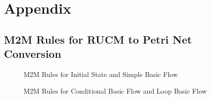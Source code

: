 \chapter{Appendix}
\section{M2M Rules for RUCM to Petri Net Conversion}\label{m2mrulesmain}


%    
%   

\begin{figure}[H]
\centering
{}
\caption{M2M Rules for Initial State and Simple Basic Flow}
\label{fig:m2mrulesdiagram1}
\end{figure}


\begin{figure}[H]
\centering
{}
\caption{M2M Rules for Conditional Basic Flow and Loop Basic Flow}
\label{fig:m2mrulesdiagram2}
\end{figure}

